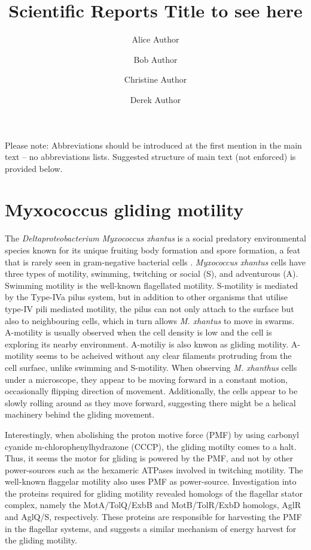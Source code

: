 \documentclass[fleqn,10pt]{wlscirep}
\title{Scientific Reports Title to see here}
\author[1,*]{Alice Author}
\author[2]{Bob Author}
\author[1,2,+]{Christine Author}
\author[2,+]{Derek Author}
\affil[1]{Affiliation, department, city, postcode, country}
\affil[2]{Affiliation, department, city, postcode, country}
\affil[*]{corresponding.author@email.example}
\affil[+]{these authors contributed equally to this work}
\begin{document}
\flushbottom
\maketitle
%
%
\thispagestyle{empty}

\noindent Please note: Abbreviations should be introduced at the first mention in the main text – no abbreviations lists. Suggested structure of main text (not enforced) is provided below.

\section*{Myxococcus gliding motility}
The \textit{Deltaproteobacterium} \textit{Myxococcus xhantus} is a social predatory environmental species known for its unique fruiting body formation and spore formation, a feat that is rarely seen in gram-negative bacterial cells \cite{kono}. \textit{Myxococcus xhantus} cells have three types of motility, swimming, twitching or social (S), and adventurous (A). Swimming motility is the well-known flagellated motility. S-motility is mediated by the Type-IVa pilus system, but in addition to other organisms that utilise type-IV pili mediated motility, the pilus can not only attach to the surface but also to neighbouring cells, which in turn allows \textit{M. xhantus} to move in swarms. A-motility is usually observed when the cell density is low and the cell is exploring its nearby environment. A-motiliy is also knwon as gliding motility. A-motility seems to be acheived without any clear filaments protruding from the cell surfaec, unlike swimming and S-motility. When observing \textit{M. xhanthus} cells under a microscope, they appear to be moving forward in a constant motion, occasionally flipping direction of movement. Additionally, the cells appear to be slowly rolling around as they move forward, suggesting there might be a helical machinery behind the gliding movement.

Interestingly, when abolishing the proton motive force (PMF) by using carbonyl cyanide m-chlorophenylhydrazone (CCCP), the gliding motilty comes to a halt. Thus, it seems the motor for gliding is powered by the PMF, and not by other power-sources such as the hexameric ATPases involved in twitching motility. The well-known flaggelar motility also uses PMF as power-source. Investigation into the proteins required for gliding motility revealed homologs of the flagellar stator complex, namely the MotA/TolQ/ExbB and MotB/TolR/ExbD homologs, AglR and AglQ/S, respectively. These proteins are responsible for harvesting the PMF in the flagellar systems, and suggests a similar mechanism of energy harvest for the gliding motility. 
\end{document}
